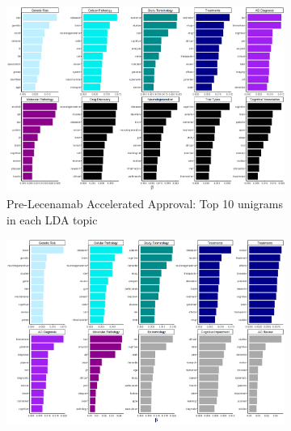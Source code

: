 \documentclass[
  a4paper,
]{article}
\begin{document}
\begin{figure}

{\centering 

\begin{figure}[H]

{\centering \includegraphics[width=6.75in,height=\textheight]{plots/pre-leca-lda-updated-blue2.png}

}

\caption{Pre-Lecenamab Accelerated Approval: Top 10 unigrams in each LDA
topic}

\end{figure}

\begin{figure}[H]

{\centering \includegraphics[width=6.75in,height=\textheight]{plots/post-leca-lda-updated-blue2.png}

}


\end{figure}}
\end{figure}
\end{document}
